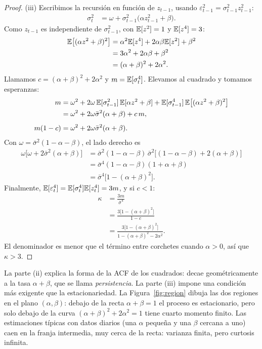 \begin{proof}
(iii) Escribimos la recursión en función de $z_{t-1}$, usando $\varepsilon_{t-1}^2=\sigma_{t-1}^2z_{t-1}^2$:
\begin{align*}
  \sigma_t^2 &= \omega+\sigma_{t-1}^2\bigl(\alpha z_{t-1}^2+\beta\bigr).
\end{align*}
Como $z_{t-1}$ es independiente de $\sigma_{t-1}^2$, con $\mathbb{E}[z^2]=1$ y $\mathbb{E}[z^4]=3$:
\begin{align*}
  \mathbb{E}\bigl[(\alpha z^2+\beta)^2\bigr] &= \alpha^2\mathbb{E}[z^4]+2\alpha\beta\mathbb{E}[z^2]+\beta^2\\
                                     &= 3\alpha^2+2\alpha\beta+\beta^2\\
                                     &= (\alpha+\beta)^2+2\alpha^2 .
\end{align*}
Llamamos $c=(\alpha+\beta)^2+2\alpha^2$ y $m=\mathbb{E}[\sigma_t^4]$. Elevamos al cuadrado y tomamos esperanzas:
\begin{align*}
  m &= \omega^2+2\omega\,\mathbb{E}[\sigma_{t-1}^2]\,\mathbb{E}[\alpha z^2+\beta]+\mathbb{E}[\sigma_{t-1}^4]\,\mathbb{E}\bigl[(\alpha z^2+\beta)^2\bigr]\\
    &= \omega^2+2\omega\bar\sigma^2(\alpha+\beta)+c\,m,\\[4pt]
  m(1-c) &= \omega^2+2\omega\bar\sigma^2(\alpha+\beta).
\end{align*}
Con $\omega=\bar\sigma^2(1-\alpha-\beta)$, el lado derecho es
\begin{align*}
  \omega\bigl[\omega+2\bar\sigma^2(\alpha+\beta)\bigr]
    &= \bar\sigma^2(1-\alpha-\beta)\,\bar\sigma^2\bigl[(1-\alpha-\beta)+2(\alpha+\beta)\bigr]\\
    &= \bar\sigma^4(1-\alpha-\beta)(1+\alpha+\beta)\\
    &= \bar\sigma^4\bigl[1-(\alpha+\beta)^2\bigr].
\end{align*}
Finalmente, $\mathbb{E}[\varepsilon_t^4]=\mathbb{E}[\sigma_t^4]\mathbb{E}[z_t^4]=3m$, y si $c<1$:
\begin{align*}
  \kappa &= \frac{3m}{\bar\sigma^4}\\
         &= \frac{3\bigl[1-(\alpha+\beta)^2\bigr]}{1-c}\\
         &= \frac{3\bigl[1-(\alpha+\beta)^2\bigr]}{1-(\alpha+\beta)^2-2\alpha^2}.
\end{align*}
El denominador es menor que el término entre corchetes cuando $\alpha>0$, así que $\kappa>3$.
\end{proof}

La parte (ii) explica la forma de la ACF de los cuadrados: decae geométricamente a la tasa $\alpha+\beta$, que
se llama \emph{persistencia}. La parte (iii) impone una condición más exigente que la estacionariedad. La
Figura~\ref{fig:region} dibuja las dos regiones en el plano $(\alpha,\beta)$: debajo de la recta
$\alpha+\beta=1$ el proceso es estacionario, pero solo debajo de la curva $(\alpha+\beta)^2+2\alpha^2=1$ tiene
cuarto momento finito. Las estimaciones típicas con datos diarios (una $\alpha$ pequeña y una $\beta$ cercana a
uno) caen en la franja intermedia, muy cerca de la recta: varianza finita, pero curtosis infinita.


